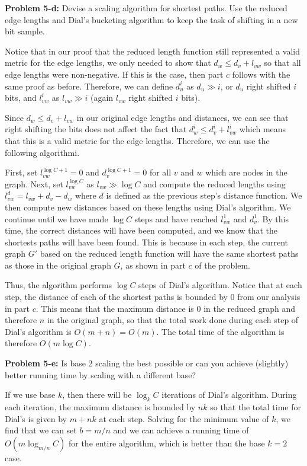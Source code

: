 \documentclass[psamsfonts]{amsart}
\newenvironment{sol}{\vspace{0.25cm}{\large \bfseries Solution:}}{\qedsymbol}
\newenvironment{prob}[1]{\begin{framed}{\large \bfseries Problem #1:}}{\end{framed}}
\begin{document}
\begin{prob}{5-d}
Devise a scaling algorithm for shortest paths. Use the reduced edge lengths and Dial's bucketing algorithm to keep the task of shifting in a new bit sample.
\end{prob}
\begin{sol}
Notice that in our proof that the reduced length function still represented a valid metric for the edge lengths, we only needed to show that $d_w \leq d_v + l_{vw}$ so that all edge lengths were non-negative. If this is the case, then part $c$ follows with the same proof as before. Therefore, we can define $d_{u}^i$ as $d_u \gg i$, or $d_u$ right shifted $i$ bits, and $l_{vw}^i$ as $l_{vw} \gg i$ (again $l_{vw}$ right shifted $i$ bits). 

Since $d_{w} \leq d_v + l_{vw}$ in our original edge lengths and distances, we can see that right shifting the bits does not affect the fact that $d_{w}^i \leq d_{v}^i + l_{vw}^i$ which means that this is a valid metric for the edge lengths. Therefore, we can use the following algorithmi.

First, set $l_{vw}^{\log C + 1} = 0$ and $d_{v}^{\log C + 1} = 0$ for all $v$ and $w$ which are nodes in the graph. Next, set $l_{vw}^{\log C}$ as $l_{vw} \gg \log C$ and compute the reduced lengths using $l_{vw}^d = l_{vw} + d_v - d_w$ where $d$ is defined as the previous step's distance function. We then compute new distances based on these lengths using Dial's algorithm. We continue until we have made $\log C$ steps and have reached $l_{vw}^1$ and $d_{v}^1$. By this time, the correct distances will have been computed, and we know that the shortests paths will have been found. This is because in each step, the current graph $G'$ based on the reduced length function will have the same shortest paths as those in the original graph $G$, as shown in part $c$ of the problem.

Thus, the algorithm performs $\log C$ steps of Dial's algorithm. Notice that at each step, the distance of each of the shortest paths is bounded by $0$ from our analysis in part $c$. This means that the maximum distance is 0 in the reduced graph and therefore $n$ in the original graph, so that the total work done during each step of Dial's algorithm is $O(m+n) = O(m)$. The total time of the algorithm is therefore $O(m \log C)$. 
\end{sol}

\begin{prob}{5-e}
Is base 2 scaling the best possible or can you achieve (slightly) better running time by scaling with a different base?
\end{prob}
\begin{sol}
If we use base $k$, then there will be $\log_{k}C$ iterations of Dial's algorithm. During each iteration, the maximum distance is bounded by $nk$ so that the total time for Dial's is given by $m + nk$ at each step. Solving for the minimum value of $k$, we find that we can set $b = m/n$ and we can achieve a running time of $O(m \log_{m/n} C)$ for the entire algorithm, which is better than the base $k=2$ case. 
\end{sol}
\end{document}

